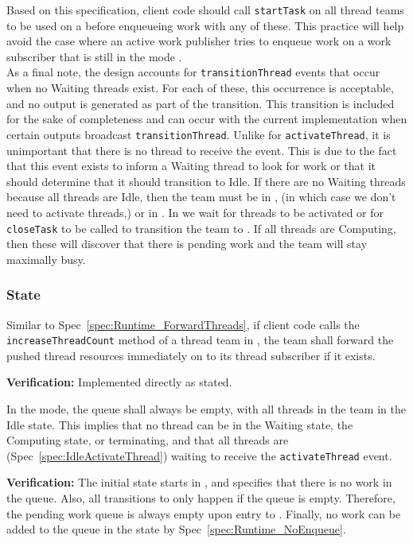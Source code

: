 \documentclass{article}
\begin{document}
Based on this specification, client code should call \texttt{startTask} on all
thread teams to be used on a \taskroutine before enqueueing work with any of these.  This
practice will help avoid the case where an active work publisher tries to
enqueue work on a work subscriber that is still in the mode \TeamIdle.\\

As a final note, the design accounts for \texttt{transitionThread} events that
occur when no Waiting threads exist.  For each of these, this occurrence is
acceptable, and no output is generated as part of the transition.  This
transition is included for the sake of completeness and can occur with the
current implementation when certain outputs broadcast \texttt{transitionThread}.
Unlike for \texttt{activateThread}, it is unimportant that there is no thread to
receive the event.  This is due to the fact that this event exists to inform a
Waiting thread to look for work or that it should determine that it should
transition to Idle.  If there are no Waiting threads because all threads are
Idle, then the team must be in \TeamIdle, (in which case we don't need to
activate threads,) or in \TeamRunningOpen.  In \TeamRunningOpen we wait for
threads to be activated or for \texttt{closeTask} to be called to transition
the team to \TeamIdle.  If all threads are Computing, then these will discover
that there is pending work and the team will stay maximally busy.

\subsubsection{{\TeamIdle} State}
\begin{spec}
Similar to Spec~\ref{spec:Runtime_ForwardThreads}, if client code calls the
\texttt{increaseThreadCount} method of a thread team in \TeamIdle, the team shall
forward the pushed thread resources immediately on to its thread subscriber if
it exists.
\end{spec}
\textbf{Verification:}\hspace{0.125in}  Implemented directly as stated.

\begin{spec}
In the {\TeamIdle} mode, the queue shall always be empty, with all threads in the
team in the Idle state.  This implies that no thread can be in the Waiting
state, the Computing state, or terminating, and that all threads are
(Spec~\ref{spec:IdleActivateThread}) waiting to receive the
\texttt{activateThread} event.
\end{spec}
\textbf{Verification:}\hspace{0.125in}  The initial state starts in {\TeamIdle},
and specifies that there is no work in the queue.  Also, all transitions to
{\TeamIdle} only happen if the queue is empty.  Therefore, the pending work
queue is always empty upon entry to \TeamIdle.  Finally, no work can be added to
the queue in the {\TeamIdle} state by Spec~\ref{spec:Runtime_NoEnqueue}.\\
\end{document}
